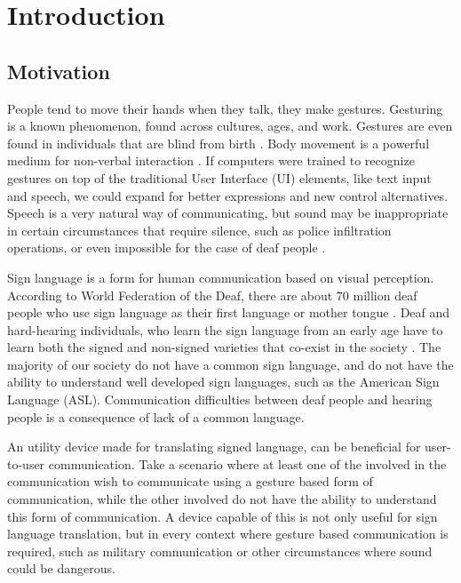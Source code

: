 \chapter{Introduction}
\label{chap:introduction}

\section{Motivation}
\label{sec:motivation}
People tend to move their hands when they talk, they make gestures.  Gesturing is a known phenomenon, found across cultures, ages, and work. Gestures are even found in individuals that are blind from birth \cite{goldin1999role}. Body movement is a powerful medium for non-verbal interaction \cite{caramiaux2015understanding}. If computers were trained to recognize gestures on top of the traditional User Interface (UI) elements, like text input and speech, we could expand for better expressions and new control alternatives. Speech is a very natural way of communicating, but sound may be inappropriate in certain circumstances that require silence, such as police infiltration operations, or even impossible for the case of deaf people \cite{paudyal2016sceptre}. 

Sign language is a form for human communication based on visual perception. According to World Federation of the Deaf, there are about 70 million deaf people who use sign language as their first language or mother tongue \cite{wfdeaf:sign_language}. Deaf and hard-hearing individuals, who learn the sign language from an early age have to learn both the signed and non-signed varieties that co-exist in the society \cite{bidoli2008english}. The majority of our society do not have a common sign language, and do not have the ability to understand well developed sign languages, such as the American Sign Language (ASL). Communication difficulties between deaf people and hearing people is a consequence of lack of a common language.

An utility device made for translating signed language, can be beneficial for user-to-user communication. Take a scenario where at least one of the involved in the communication wish to communicate using a gesture based form of communication, while the other involved do not have the ability to understand this form of communication. A device capable of this is not only useful for sign language translation, but in every context where gesture based communication is required, such as military communication or other circumstances where sound could be dangerous.


